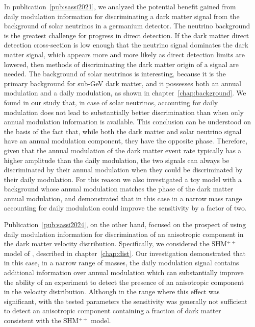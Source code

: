 \documentclass[b5paper, 10pt, twoside]{book}
\begin{document}
In publication~\ref{pub:sassi2021}, we analyzed the potential benefit gained from daily modulation information for discriminating a dark matter signal from the background of solar neutrinos in a germanium detector. The neutrino background is the greatest challenge for progress in direct detection. If the dark matter direct detection cross-section is low enough that the neutrino signal dominates the dark matter signal, which appears more and more likely as direct detection limits are lowered, then methods of discriminating the dark matter origin of a signal are needed. The background of solar neutrinos is interesting, because it is the primary background for sub-GeV dark matter, and it possesses both an annual modulation and a daily modulation, as shown in chapter~\ref{chap:background}. We found in our study that, in case of solar neutrinos, accounting for daily modulation does not lead to substantially better discrimination than when only annual modulation information is available. This conclusion can be understood on the basis of the fact that, while both the dark matter and solar neutrino signal have an annual modulation component, they have the opposite phase. Therefore, given that the annual modulation of the dark matter event rate typically has a higher amplitude than the daily modulation, the two signals can always be discriminated by their annual modulation when they could be discriminated by their daily modulation. For this reason we also investigated a toy model with a background whose annual modulation matches the phase of the dark matter annual modulation, and demonstrated that in this case in a narrow mass range accounting for daily modulation could improve the sensitivity by a factor of two.

Publication~\ref{pub:sassi2024}, on the other hand, focused on the prospect of using daily modulation information for discrimination of an anisotropic component in the dark matter velocity distribution. Specifically, we considered the SHM$^{++}$ model of \textcite{EvansOHareMcCabe2019}, described in chapter~\ref{chap:dist}. Our investigation demonstrated that in this case, in a narrow range of masses, the daily modulation signal contains additional information over annual modulation which can substantially improve the ability of an experiment to detect the presence of an anisotropic component in the velocity distribution. Although in the range where this effect was significant, with the tested parameters the sensitivity was generally not sufficient to detect an anisotropic component containing a fraction of dark matter consistent with the SHM$^{++}$ model.
\end{document}
